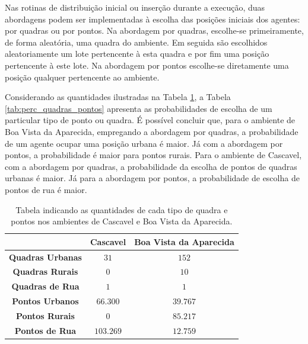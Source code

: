 Nas rotinas de distribuição inicial ou inserção durante a execução, duas abordagens podem ser implementadas à escolha das posições iniciais dos agentes: por quadras ou por pontos. Na abordagem por quadras, escolhe-se primeiramente, de forma aleatória, uma quadra do ambiente. Em seguida são escolhidos aleatoriamente um lote pertencente à esta quadra e por fim uma posição pertencente à este lote. Na abordagem por pontos escolhe-se diretamente uma posição qualquer pertencente ao ambiente. 

Considerando as quantidades ilustradas na Tabela \ref{tab:quant_quadras_pontos}, a Tabela \ref{tab:perc_quadras_pontos} apresenta as probabilidades de escolha de um particular tipo de ponto ou quadra. É possível concluir que, para o ambiente de Boa Vista da Aparecida, empregando a abordagem por quadras, a probabilidade de um agente ocupar uma posição urbana é maior. Já com a abordagem por pontos, a probabilidade é maior para pontos rurais. Para o ambiente de Cascavel, com a abordagem por quadras, a probabilidade da escolha de pontos de quadras urbanas é maior. Já para a abordagem por pontos, a probabilidade de escolha de pontos de rua é maior. 

\begin{table}[H]
\centering
\begin{tabular}{c|c|c}
				& \textbf{Cascavel}		& \textbf{Boa Vista da Aparecida} 	\\ \hline
 \textbf{Quadras Urbanas}	& $31$				& $152$	  				\\
 \textbf{Quadras Rurais} 	& $0$				& $10$	  				\\
 \textbf{Quadras de Rua}	& $1$				& $1$	  				\\ \hline
 \textbf{Pontos Urbanos}	& $66.300$			& $39.767$	  			\\ 
 \textbf{Pontos Rurais}		& $0$				& $85.217$  				\\
 \textbf{Pontos de Rua}		& $103.269$			& $12.759$  				\\
 \end{tabular}
\caption{Tabela indicando as quantidades de cada tipo de quadra e pontos nos ambientes de Cascavel e Boa Vista da Aparecida. }
\label{tab:quant_quadras_pontos}
\end{table}

